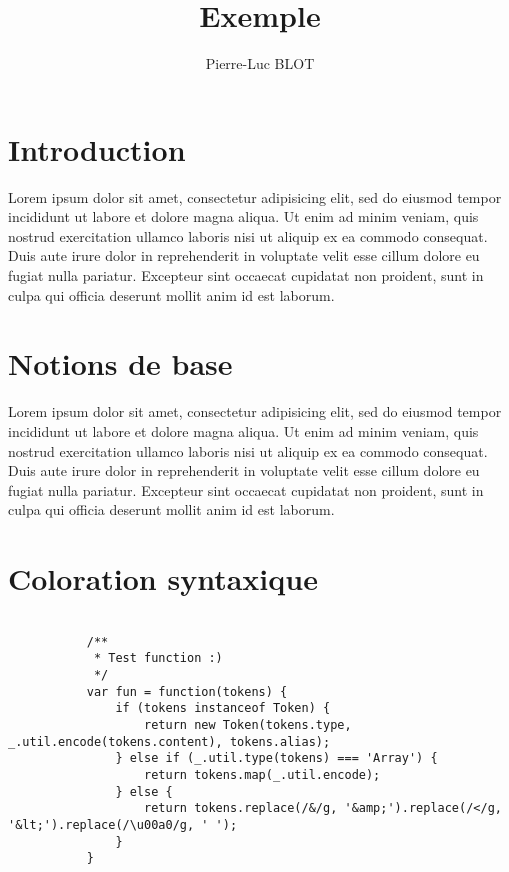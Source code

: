 \documentclass{article}
\title{Exemple}
\author{Pierre-Luc BLOT}
\begin{document}
	\maketitle
	\newpage
	\tableofcontents
	\newpage

	\section{Introduction}
		Lorem ipsum dolor sit amet, consectetur adipisicing elit, sed do eiusmod
		tempor incididunt ut labore et dolore magna aliqua. Ut enim ad minim veniam,
		quis nostrud exercitation ullamco laboris nisi ut aliquip ex ea commodo
		consequat. Duis aute irure dolor in reprehenderit in voluptate velit esse
		cillum dolore eu fugiat nulla pariatur. Excepteur sint occaecat cupidatat non
		proident, sunt in culpa qui officia deserunt mollit anim id est laborum.
	\section{Notions de base}
		Lorem ipsum dolor sit amet, consectetur adipisicing elit, sed do eiusmod
		tempor incididunt ut labore et dolore magna aliqua. Ut enim ad minim veniam,
		quis nostrud exercitation ullamco laboris nisi ut aliquip ex ea commodo
		consequat. Duis aute irure dolor in reprehenderit in voluptate velit esse
		cillum dolore eu fugiat nulla pariatur. Excepteur sint occaecat cupidatat non
		proident, sunt in culpa qui officia deserunt mollit anim id est laborum.

	\section{Coloration syntaxique}
		\begin{verbatim}

           /**
            * Test function :)
            */
           var fun = function(tokens) {
               if (tokens instanceof Token) {
                   return new Token(tokens.type, _.util.encode(tokens.content), tokens.alias);
               } else if (_.util.type(tokens) === 'Array') {
                   return tokens.map(_.util.encode);
               } else {
                   return tokens.replace(/&/g, '&amp;').replace(/</g, '&lt;').replace(/\u00a0/g, ' ');
               }
           }
        \end{verbatim}
\end{document}
